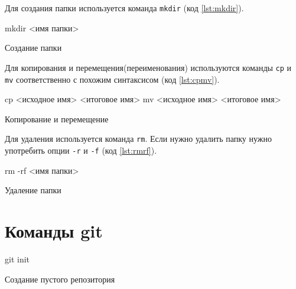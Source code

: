 \documentclass[12pt]{article}
\begin{document}
Для создания папки используется команда \verb|mkdir| (код \ref{lst:mkdir}).
\begin{listing}[H]
\begin{center}
\begin{bashcode}
mkdir <имя папки>
\end{bashcode}
\end{center}
\caption{Создание папки}
\label{lst:mkdir}
\end{listing}

Для копирования и перемещения(переименования) используются команды \verb|cp| и \verb|mv| соответственно с похожим синтаксисом (код \ref{lst:cpmv}).
\begin{listing}[H]
\begin{center}
\begin{bashcode}
cp <исходное имя> <итоговое имя>
mv <исходное имя> <итоговое имя>
\end{bashcode}
\end{center}
\caption{Копирование и перемещение}
\label{lst:cpmv}
\end{listing}

Для удаления используется команда \verb|rm|. Если нужно удалить папку нужно употребить опции \verb|-r| и \verb|-f| (код \ref{lst:rmrf}).
\begin{listing}[H]
\begin{center}
\begin{bashcode}
rm -rf <имя папки>
\end{bashcode}
\end{center}
\caption{Удаление папки}
\label{lst:rmrf}
\end{listing}

\section{Команды git}


\begin{listing}[ht]
\begin{center}
\begin{bashcode}
git init
\end{bashcode}
\end{center}
\caption{Создание пустого репозитория}
\label{lst:gitinit}
\end{listing}
\end{document}
